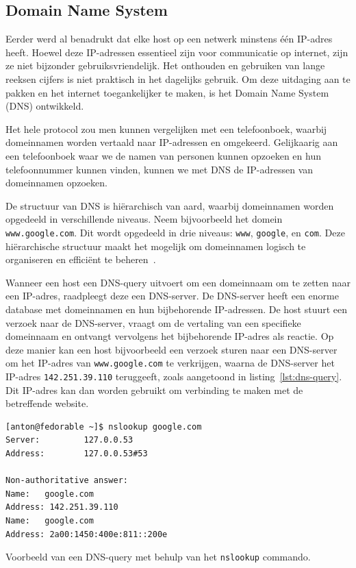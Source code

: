 \subsection{Domain Name System}
\label{netwerk_dns}

Eerder werd al benadrukt dat elke host op een netwerk minstens één IP-adres heeft.
Hoewel deze IP-adressen essentieel zijn voor communicatie op internet, zijn ze niet bijzonder gebruiksvriendelijk.
Het onthouden en gebruiken van lange reeksen cijfers is niet praktisch in het dagelijks gebruik.
Om deze uitdaging aan te pakken en het internet toegankelijker te maken, is het Domain Name System (DNS) ontwikkeld.

Het hele protocol zou men kunnen vergelijken met een telefoonboek, waarbij domeinnamen worden vertaald naar IP-adressen en omgekeerd.
Gelijkaarig aan een telefoonboek waar we de namen van personen kunnen opzoeken en hun telefoonnummer kunnen vinden, kunnen we met DNS de IP-adressen van domeinnamen opzoeken.

De structuur van DNS is hi\"erarchisch van aard, waarbij domeinnamen worden opgedeeld in verschillende niveaus.
Neem bijvoorbeeld het domein \texttt{www.google.com}. Dit wordt opgedeeld in drie niveaus: \texttt{www}, \texttt{google}, en \texttt{com}.
Deze hi\"erarchische structuur maakt het mogelijk om domeinnamen logisch te organiseren en effici\"ent te beheren~\autocite{dordal2020}.

Wanneer een host een DNS-query uitvoert om een domeinnaam om te zetten naar een IP-adres, raadpleegt deze een DNS-server.
De DNS-server heeft een enorme database met domeinnamen en hun bijbehorende IP-adressen.
De host stuurt een verzoek naar de DNS-server, vraagt om de vertaling van een specifieke domeinnaam en ontvangt vervolgens het bijbehorende IP-adres als reactie.
Op deze manier kan een host bijvoorbeeld een verzoek sturen naar een DNS-server om het IP-adres van \texttt{www.google.com} te verkrijgen, waarna de DNS-server het IP-adres \texttt{142.251.39.110} teruggeeft, zoals aangetoond in listing~\ref{lst:dns-query}.
Dit IP-adres kan dan worden gebruikt om verbinding te maken met de betreffende website.

\begin{listing}
  \begin{verbatim}
[anton@fedorable ~]$ nslookup google.com
Server:         127.0.0.53
Address:        127.0.0.53#53

Non-authoritative answer:
Name:   google.com
Address: 142.251.39.110
Name:   google.com
Address: 2a00:1450:400e:811::200e
  \end{verbatim}
  \caption[DNS-query met \texttt{nslookup}]{Voorbeeld van een DNS-query met behulp van het \texttt{nslookup} commando.}
  \label{lst:dns-query}
\end{listing}
